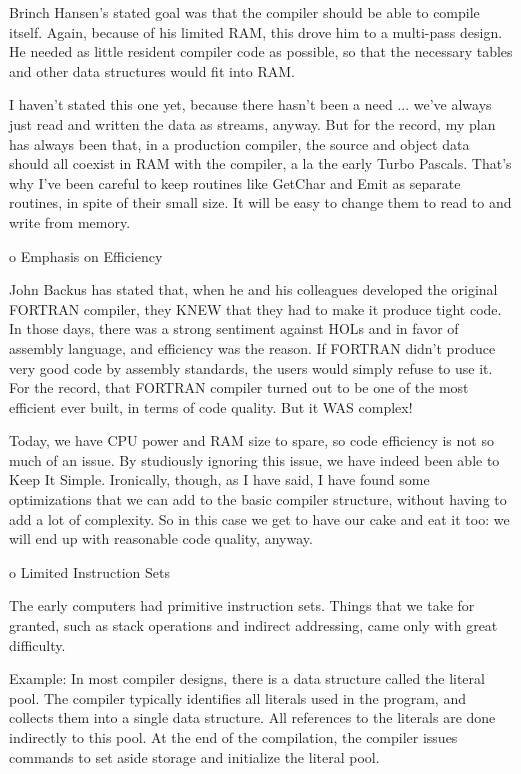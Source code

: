 \documentclass[float=false, crop=false]{standalone}
\begin{document}
\begin{emeration}
     Brinch Hansen's  stated goal was that the compiler should be
     able to compile itself.   Again, because of his limited RAM,
     this drove him to a multi-pass design.  He needed  as little
     resident compiler code as possible,  so  that  the necessary
     tables and other data structures would fit into RAM.

     I haven't stated this one yet, because there  hasn't  been a
     need  ... we've always just read and  written  the  data  as
     streams, anyway.  But  for  the  record,  my plan has always
     been that, in  a  production compiler, the source and object
     data should all coexist  in  RAM with the compiler, a la the
     early Turbo Pascals.  That's why I've been  careful  to keep
     routines like GetChar  and  Emit  as  separate  routines, in
     spite of their small size.   It  will be easy to change them
     to read to and write from memory.


  o  Emphasis on Efficiency

     John  Backus has stated that, when  he  and  his  colleagues
     developed the original FORTRAN compiler, they KNEW that they
     had to make it produce tight code.  In those days, there was
     a strong sentiment against HOLs  and  in  favor  of assembly
     language, and  efficiency was the reason.  If FORTRAN didn't
     produce very good  code  by  assembly  standards,  the users
     would simply refuse to use it.  For the record, that FORTRAN
     compiler turned out to  be  one  of  the most efficient ever
     built, in terms of code quality.  But it WAS complex!

     Today,  we have CPU power and RAM size  to  spare,  so  code
     efficiency is not  so  much  of  an  issue.    By studiously
     ignoring this issue, we  have  indeed  been  able to Keep It
     Simple.    Ironically,  though, as I have said, I have found
     some optimizations that we can  add  to  the  basic compiler
     structure, without having to add a lot of complexity.  So in
     this  case we get to have our cake and eat it too:  we  will
     end up with reasonable code quality, anyway.


  o  Limited Instruction Sets

     The early computers had primitive instruction sets.   Things
     that  we  take  for granted, such as  stack  operations  and
     indirect addressing, came only with great difficulty.

     Example: In most compiler designs, there is a data structure
     called the literal pool.  The compiler  typically identifies
     all literals used in the program, and collects  them  into a
     single data structure.    All references to the literals are
     done  indirectly  to  this  pool.    At  the   end   of  the
     compilation, the  compiler  issues  commands  to  set  aside
     storage and initialize the literal pool.


\end{emeration}
\end{document}
